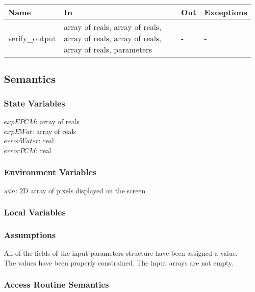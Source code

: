 \documentclass[12pt]{article}
\begin{document}
\begin{center}
\begin{tabular}{p{3cm} p{7cm} p{2cm} p{2cm}}
\hline
\textbf{Name} & \textbf{In} & \textbf{Out} & \textbf{Exceptions} \\
\hline
verify\_output & array of reals, array of reals, array of reals, array of reals, array of reals, parameters & - & - \\
\hline
\end{tabular}
\end{center}

\subsection{Semantics}

\subsubsection{State Variables}

$expEPCM$: array of reals \\
$expEWat$: array of reals \\
$errorWater$: real \\
$errorPCM$: real

\subsubsection{Environment Variables}

$win$: 2D array of pixels displayed on the screen

\subsubsection{Local Variables}

\subsubsection{Assumptions}

All of the fields of the input parameters structure have been assigned a
value. The values have been properly constrained. The input arrays are not
empty.

\subsubsection{Access Routine Semantics}
\end{document}
